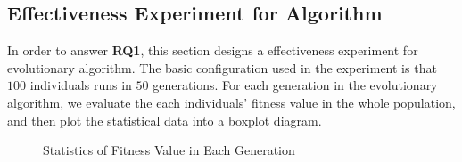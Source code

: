 \subsection{Effectiveness Experiment for Algorithm}
%
In order to answer \textbf{RQ1}, this section designs a effectiveness experiment
for evolutionary algorithm. The basic configuration used in the experiment is
that $100$ individuals runs in $50$ generations. For each generation in the
evolutionary algorithm, we evaluate the each individuals' fitness value in the
whole population, and then plot the statistical data into a boxplot diagram.

\begin{figure}[!h]
  \centering


  \caption{Statistics of Fitness Value in Each Generation}
  \label{fig:pj}
\end{figure}

